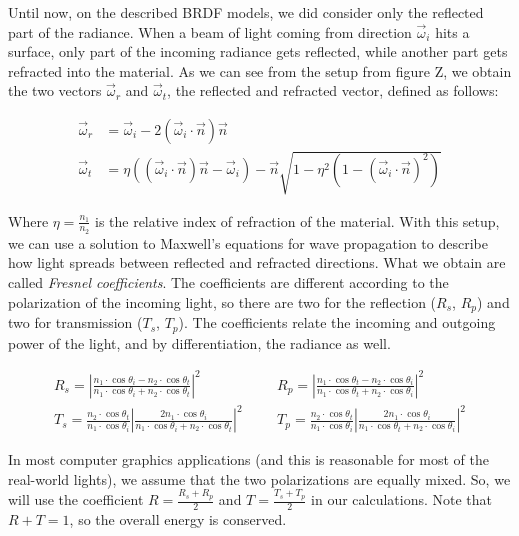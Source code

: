 Until now, on the described BRDF models, we did consider only the reflected part of the radiance. When a beam of light coming from direction $\vec{\omega}_i$ hits a surface, only part of the incoming radiance gets reflected, while another part gets refracted into the material. As we can see from the setup from figure Z, we obtain the two vectors $\vec{\omega}_r$ and $\vec{\omega}_t$, the reflected and refracted vector, defined as follows:

\begin{equation*}
\begin{split}
\vec{\omega}_r &= \vec{\omega}_i - 2 (\vec{\omega}_i \cdot \vec{n}) \vec{n} \\
\vec{\omega}_t &= \eta ((\vec{\omega}_i \cdot \vec{n}) \vec{n} - \vec{\omega}_i) - \vec{n} \sqrt{1 - \eta^2 (1 - (\vec{\omega}_i \cdot \vec{n}) ^ 2)}
\end{split}
\end{equation*}

Where $\eta = \frac{n_1}{n_2}$ is the relative index of refraction of the material. With this setup, we can use a solution to Maxwell's equations for wave propagation to describe how light spreads between reflected and refracted directions. What we obtain are called \emph{Fresnel coefficients}. The coefficients are different according to the polarization of the incoming light, so there are two for the reflection ($R_s$, $R_p$) and two for transmission ($T_s$, $T_p$). The coefficients relate the incoming and outgoing power of the light, and by differentiation, the radiance as well.

\begin{equation*}
\begin{split}
R_s = \left|\frac{n_1 \cdot \cos\theta_i - n_2 \cdot \cos\theta_t} {n_1 \cdot \cos\theta_i + n_2 \cdot \cos\theta_t}\right|^2 \;\;\;&\;\;\; R_p = \left|\frac{n_1 \cdot \cos\theta_t - n_2 \cdot \cos\theta_i} {n_1 \cdot \cos\theta_t + n_2 \cdot \cos\theta_i}\right|^2\\
T_s = \frac{n_2 \cdot \cos\theta_t}{n_1 \cdot \cos\theta_i} \left|\frac{2 n_1 \cdot \cos\theta_i}{n_1 \cdot \cos\theta_i + n_2 \cdot \cos\theta_t}\right|^2 \;\;\;&\;\;\; T_p = \frac{n_2 \cdot \cos\theta_t}{n_1 \cdot \cos\theta_i}  \left|\frac{2 n_1 \cdot \cos\theta_i}{n_1 \cdot \cos\theta_t + n_2 \cdot \cos\theta_i}\right|^2
\end{split}
\end{equation*}

In most computer graphics applications (and this is reasonable for most of the real-world lights), we assume that the two polarizations are equally mixed. So, we will use the coefficient $R = \frac{R_s + R_p}{2}$ and $T = \frac{T_s + T_p}{2}$ in our calculations. Note that $R + T = 1$, so the overall energy is conserved.

